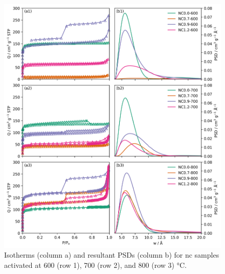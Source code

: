 \begin{figure}[t!]
    \centering
    \includegraphics[width=\columnwidth, keepaspectratio]{4-impregnation/figs/NC_n2_isotherms.png}
    \caption{Isotherms (column a) and resultant PSDs (column b) for \acrshort{nc} samples activated at 600 (row 1), 700 (row 2), and 800 (row 3) \unit{\degreeCelsius}.}
    \label{fig:NC_n2_isotherms}
\end{figure}

